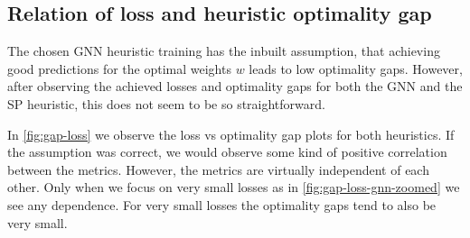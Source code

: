 \documentclass[english, 12pt, a4paper, sci, utf8, a-2b, online]{aaltothesis}
\begin{document}
\subsection{Relation of loss and heuristic optimality gap}
\label{sec:loss-gap-relation}

The chosen GNN heuristic training has the inbuilt assumption, that achieving good predictions for the optimal weights $w$ leads to low optimality gaps. However, after observing the achieved losses and optimality gaps for both the GNN and the SP heuristic, this does not seem to be so straightforward.

In \cref{fig:gap-loss} we observe the loss vs optimality gap plots for both heuristics. If the assumption was correct, we would observe some kind of positive correlation between the metrics. However, the metrics are virtually independent of each other. Only when we focus on very small losses as in \cref{fig:gap-loss-gnn-zoomed} we see any dependence. For very small losses the optimality gaps tend to also be very small.
\end{document}
